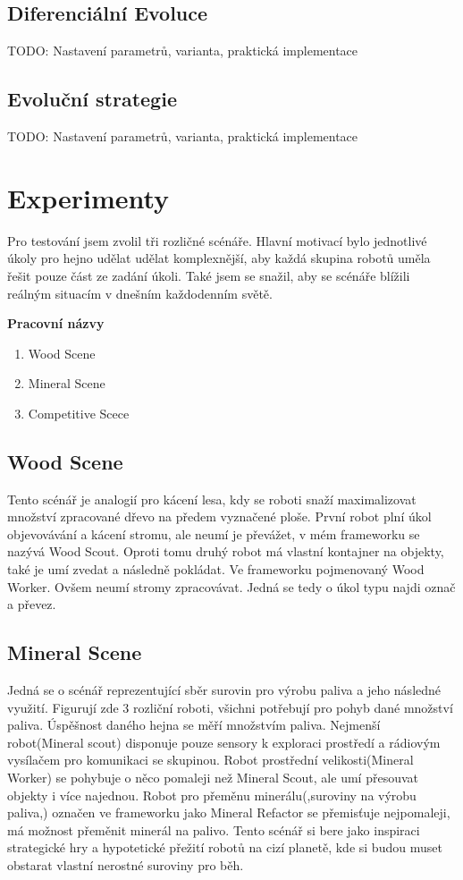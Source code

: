 \subsection{Diferenciální Evoluce}
TODO: Nastavení parametrů, varianta, praktická implementace

\subsection{Evoluční strategie}
TODO: Nastavení parametrů, varianta, praktická implementace

\section{Experimenty}
Pro testování jsem zvolil tři rozličné scénáře. Hlavní motivací bylo jednotlivé úkoly pro hejno udělat udělat komplexnější, aby každá skupina robotů uměla řešit pouze část ze zadání úkoli. Také jsem se snažil, aby se scénáře blížili reálným situacím v dnešním každodenním světě.\par 
\textbf{Pracovní názvy}
\begin{enumerate}
    \item Wood Scene
    \item Mineral Scene
    \item Competitive Scece
\end{enumerate}

\subsection{Wood Scene}
Tento scénář je analogií pro kácení lesa, kdy se roboti snaží maximalizovat množství zpracované dřevo na předem vyznačené ploše. První robot plní úkol objevovávání a kácení stromu, ale neumí je převážet, v mém frameworku se nazývá Wood Scout. Oproti tomu druhý robot má vlastní kontajner na objekty, také je umí zvedat a následně pokládat. Ve frameworku pojmenovaný Wood Worker. Ovšem neumí stromy zpracovávat. Jedná se tedy o úkol typu najdi označ a převez.

\subsection{Mineral Scene}
Jedná se o scénář reprezentující sběr surovin pro výrobu paliva a jeho následné využití. Figurují zde 3 rozliční roboti, všichni potřebují pro pohyb  dané množství paliva. Úspěšnost daného hejna se měří množstvím paliva. Nejmenší robot(Mineral scout) disponuje pouze sensory k exploraci prostředí a rádiovým vysílačem pro komunikaci se skupinou. Robot prostřední velikosti(Mineral Worker) se pohybuje o něco pomaleji než Mineral Scout, ale umí přesouvat objekty i více najednou. Robot pro přeměnu minerálu(,suroviny na výrobu paliva,) označen ve frameworku jako Mineral Refactor se přemisťuje nejpomaleji, má možnost přeměnit minerál na palivo. Tento scénář si bere jako inspiraci strategické hry a hypotetické přežití robotů na cizí planetě, kde si budou muset obstarat vlastní 
nerostné suroviny pro běh.

